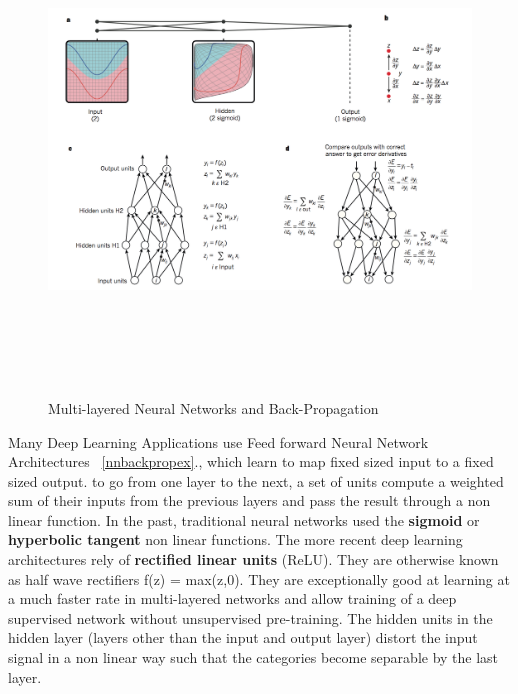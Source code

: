 \begin{figure}[ht!]
  \centering
  \includegraphics[height=130mm,  width=160mm]{figures/3_nnbackprop.png}
  \caption[Multi-layered Neural Networks and Back-Propagation]{Multi-layered Neural Networks and Back-Propagation \footnotemark}
  \label{nnbackpropex}
\end{figure}

Many Deep Learning Applications use Feed forward Neural Network Architectures ~\autoref{nnbackpropex}., which learn to map fixed sized input to a fixed sized output. to go from one layer to the next, a set of units compute a weighted sum of their inputs from the previous layers and pass the result through a non linear function. In the past, traditional neural networks used the \textbf{sigmoid} or \textbf{hyperbolic tangent} non linear functions. The more recent deep learning architectures rely of \textbf{rectified linear units }(ReLU). They are otherwise known as half wave rectifiers f(z) = max(z,0). They are exceptionally good at learning at a much faster rate in multi-layered networks and allow training of a deep supervised network without unsupervised pre-training. The hidden units in the hidden layer (layers other than the input and output layer) distort the input signal in a non linear way such that the categories become separable by the last layer.
\newline

